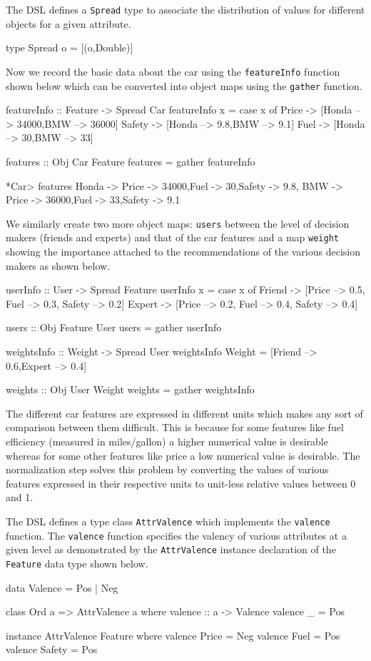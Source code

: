 \documentclass{jfp}
\newcommand{\prog}[1]{\texttt{#1}}
\begin{document}
The DSL defines a \prog{Spread} type to associate the distribution of values for different objects for a given attribute.
\begin{haskellcode}
type Spread o = [(o,Double)]
\end{haskellcode}
Now we record the basic data about the car using the \prog{featureInfo} function shown below which can be converted into object maps using the \prog{gather} function. 
\begin{haskellcode}
featureInfo :: Feature -> Spread Car
featureInfo x 
    = case x of Price ->  [Honda --> 34000,BMW --> 36000]
                Safety -> [Honda --> 9.8,BMW --> 9.1]
                Fuel   -> [Honda --> 30,BMW --> 33]

features :: Obj Car Feature
features = gather featureInfo

*Car> features
{Honda -> {Price -> 34000,Fuel -> 30,Safety -> 9.8},
 BMW   -> {Price -> 36000,Fuel -> 33,Safety -> 9.1}}
\end{haskellcode}
We similarly create two more object maps: \prog{users} between the level of decision makers (friends and experts) and that of the car features and a map \prog{weight} showing the importance attached to the recommendations of the various decision makers as shown below. 
\begin{haskellcode}
userInfo :: User -> Spread Feature
userInfo x = case x of Friend -> [Price --> 0.5, Fuel --> 0.3, Safety --> 0.2]
                       Expert -> [Price --> 0.2, Fuel --> 0.4, Safety --> 0.4]

users :: Obj Feature User
users = gather userInfo

weightsInfo :: Weight -> Spread User 
weightsInfo Weight = [Friend --> 0.6,Expert --> 0.4]

weights :: Obj User Weight
weights = gather weightsInfo
\end{haskellcode}

The different car features are expressed in different units which makes any sort of comparison between them difficult. This is because for some features like fuel efficiency (measured in miles/gallon) a higher numerical value is desirable whereas for some other features like price a low numerical value is desirable. The normalization step solves this problem by converting the values of various features expressed in their respective units to unit-less relative values between 0 and 1. 

The DSL defines a type class \prog{AttrValence} which implements the \prog{valence} function. The \prog{valence} function specifies the valency of various attributes at a given level as demonstrated by the \prog{AttrValence} instance declaration of the \prog{Feature} data type shown below. 
\begin{haskellcode}
data Valence = Pos | Neg

class Ord a => AttrValence a where
   valence :: a -> Valence
   valence _ = Pos

instance AttrValence Feature where
   valence Price  = Neg
   valence Fuel   = Pos
   valence Safety = Pos
\end{haskellcode}
\end{document}
